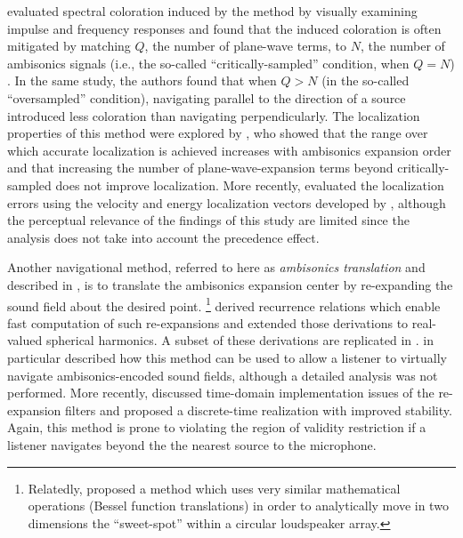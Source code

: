 \citet{HahnSpors2015b} evaluated spectral coloration induced by the method by visually examining impulse and frequency responses and found that the induced coloration is often mitigated by matching $Q$, the number of plane-wave terms, to $N$, the number of ambisonics signals (i.e., the so-called ``critically-sampled'' condition, when $Q = N$) \citep[section 5]{HahnSpors2015b}. %
In the same study, the authors found that when $Q > N$ (in the so-called ``oversampled'' condition), navigating parallel to the direction of a source introduced less coloration than navigating perpendicularly. %
The localization properties of this method were explored by \citet{Winter2014}, who showed that the range over which accurate localization is achieved increases with ambisonics expansion order and that increasing the number of plane-wave-expansion terms beyond critically-sampled does not improve localization.
More recently, \citet{TylkaChoueiri2015} evaluated the localization errors using the velocity and energy localization vectors developed by \citet{Gerzon1992}, although the perceptual relevance of the findings of this study are limited since the analysis does not take into account the precedence effect.

Another navigational method, referred to here as \textit{ambisonics translation} and described in , is to translate the ambisonics expansion center by re-expanding the sound field about the desired point.%
\footnote{Relatedly, \citet{AhrensSpors2009} proposed a method which uses very similar mathematical operations (Bessel function translations) in order to analytically move in two dimensions the ``sweet-spot'' within a circular loudspeaker array.}
\citet{GumerovDuraiswami2005} derived recurrence relations which enable fast computation of such re-expansions and \citet{Zotter2009PhD} extended those derivations to real-valued spherical harmonics.
A subset of these derivations are replicated in .
\citet{MenziesAlAkaidi2007a} in particular described how this method can be used to allow a listener to virtually navigate ambisonics-encoded sound fields, although a detailed analysis was not performed.
More recently, \citet{BaumgartnerZotter2012} discussed time-domain implementation issues of the re-expansion filters and proposed a discrete-time realization with improved stability.
Again, this method is prone to violating the region of validity restriction if a listener navigates beyond the the nearest source to the microphone.


